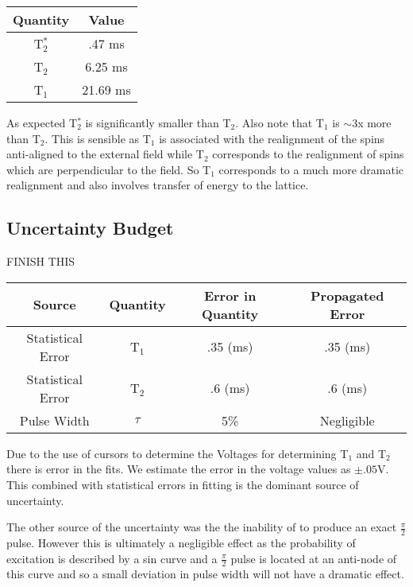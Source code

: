 \documentclass[11pt,letterpaper]{article}
\begin{document}
\begin{center}
	\begin{tabular}{|c|c|}\hline
		Quantity & Value \\ \hline\hline
		T$_2^*$ & .47 ms \\ \hline
		T$_2$ & 6.25 ms \\ \hline
		T$_1$ & 21.69 ms \\ \hline
	\end{tabular}
\end{center}
As expected T$_2^*$ is significantly smaller than T$_2$. Also note that T$_1$ is $\sim$3x more than T$_2$. This is sensible as T$_1$ is associated with the realignment of the spins anti-aligned to the external field while T$_2$ corresponds to the realignment of spins which are perpendicular to the field. So T$_1$ corresponds to a much more dramatic realignment and also involves transfer of energy to the lattice.

\subsection{Uncertainty Budget}
FINISH THIS \\
\begin{table}[h]
	\begin{center}
		\begin{tabular}{|c|c|c|c|} \hline 
			Source & Quantity&  Error in Quantity  & Propagated Error  \\ \hline \hline
			Statistical Error & T$_1$ & .35 (ms) & .35 (ms)\\ \hline 
			Statistical Error & T$_2$ & .6 (ms)& .6 (ms)\\ \hline
			Pulse Width& $\tau$ & 5\% & Negligible\\
			\hline
		\end{tabular}
	\end{center}
\end{table}

Due to the use of cursors to determine the Voltages for determining T$_1$ and T$_2$ there is error in the fits. We estimate the error in the voltage values as $\pm .05$V. This combined with statistical errors in fitting is the dominant source of uncertainty.

The other source of the uncertainty was the the inability of to produce an exact $\frac{\pi}{2}$ pulse. However this is ultimately a negligible effect as the probability of excitation is described by a sin curve and a $\frac{\pi}{2}$ pulse is located at an anti-node of this curve and so a small deviation in pulse width will not have a dramatic effect.
\end{document}
